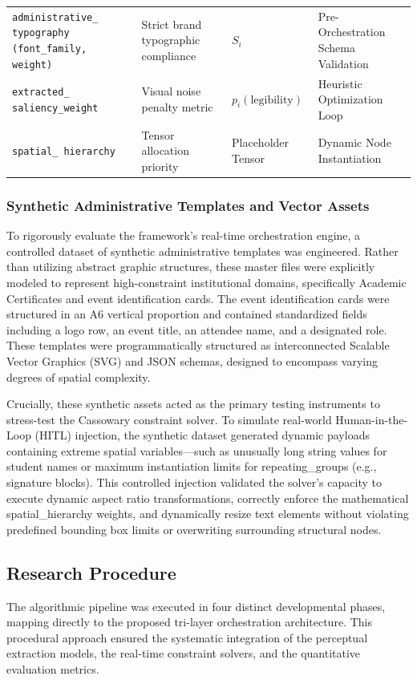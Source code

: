 \begin{refsection}
\begin{table}[ht]
\begin{tabular}{p{} p{} p{} p{}}
\texttt{administrative\_ typography (font\_family, weight)} 
& Strict brand typographic compliance 
& $S_i$ 
& Pre-Orchestration Schema Validation \\

\texttt{extracted\_ saliency\_weight} 
& Visual noise penalty metric 
& $p_i(\text{legibility})$ 
& Heuristic Optimization Loop \\

\texttt{spatial\_ hierarchy} 
& Tensor allocation priority 
& Placeholder Tensor 
& Dynamic Node Instantiation \\ \hline

\end{tabular}
\end{table}


\subsubsection{Synthetic Administrative Templates and Vector Assets}
To rigorously evaluate the framework's real-time orchestration engine, a controlled dataset of synthetic administrative templates was engineered. Rather than utilizing abstract graphic structures, these master files were explicitly modeled to represent high-constraint institutional domains, specifically Academic Certificates and event identification cards. The event identification cards were structured in an A6 vertical proportion and contained standardized fields including a logo row, an event title, an attendee name, and a designated role. These templates were programmatically structured as interconnected Scalable Vector Graphics (SVG) and JSON schemas, designed to encompass varying degrees of spatial complexity.

Crucially, these synthetic assets acted as the primary testing instruments to stress-test the Cassowary constraint solver. To simulate real-world Human-in-the-Loop (HITL) injection, the synthetic dataset generated dynamic payloads containing extreme spatial variables—such as unusually long string values for student names or maximum instantiation limits for repeating\_groups (e.g., signature blocks). This controlled injection validated the solver’s capacity to execute dynamic aspect ratio transformations, correctly enforce the mathematical spatial_hierarchy weights, and dynamically resize text elements without violating predefined bounding box limits or overwriting surrounding structural nodes.



\subsection{Research Procedure}
The algorithmic pipeline was executed in four distinct developmental phases, mapping directly to the proposed tri-layer orchestration architecture. This procedural approach ensured the systematic integration of the perceptual extraction models, the real-time constraint solvers, and the quantitative evaluation metrics.


\end{refsection}
